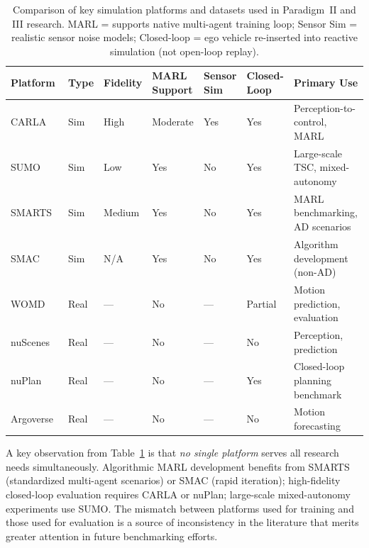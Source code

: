 \documentclass[12pt, a4paper]{article}
\begin{document}
\begin{table}[ht]
\centering
\caption{Comparison of key simulation platforms and datasets used in Paradigm~II
and III research.  MARL = supports native multi-agent training loop; Sensor Sim
= realistic sensor noise models; Closed-loop = ego vehicle re-inserted into reactive
simulation (not open-loop replay).
\label{tab:sim_comparison}}
\renewcommand{\arraystretch}{1.2}
\small
\begin{tabular}{lllllll}
\toprule
\textbf{Platform} & \textbf{Type} & \textbf{Fidelity} & \textbf{MARL Support}
& \textbf{Sensor Sim} & \textbf{Closed-Loop} & \textbf{Primary Use} \\
\midrule
CARLA~\cite{dosovitskiy2017carlaopenurbandriving} & Sim  & High    & Moderate & Yes & Yes & Perception-to-control, MARL \\
SUMO~\cite{krajzewicz2012recent}                  & Sim  & Low     & Yes      & No  & Yes & Large-scale TSC, mixed-autonomy \\
SMARTS~\cite{zhou2020smarts}                      & Sim  & Medium  & Yes      & No  & Yes & MARL benchmarking, AD scenarios \\
SMAC~\cite{samvelyan2019starcraft}                & Sim  & N/A     & Yes      & No  & Yes & Algorithm development (non-AD) \\
WOMD~\cite{ettinger2021large}                     & Real & ---     & No       & --- & Partial & Motion prediction, evaluation \\
nuScenes~\cite{caesar2020nuscenes}                & Real & ---     & No       & --- & No      & Perception, prediction \\
nuPlan~\cite{caesar2021nuplan}                    & Real & ---     & No       & --- & Yes     & Closed-loop planning benchmark \\
Argoverse~\cite{chang2019argoverse}               & Real & ---     & No       & --- & No      & Motion forecasting \\
\bottomrule
\end{tabular}
\end{table}

\noindent A key observation from Table~\ref{tab:sim_comparison} is that
\emph{no single platform} serves all research needs simultaneously.
Algorithmic MARL development benefits from SMARTS (standardized multi-agent
scenarios) or SMAC (rapid iteration); high-fidelity closed-loop evaluation
requires CARLA or nuPlan; large-scale mixed-autonomy experiments use SUMO.
The mismatch between platforms used for training and those used for evaluation
is a source of inconsistency in the literature that merits greater attention in future benchmarking efforts.
\end{document}
